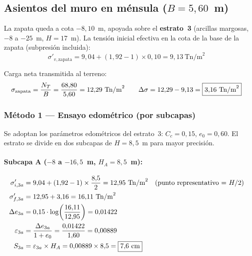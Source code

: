 \subsection{Asientos del muro en ménsula ($B = 5{,}60$~m)}
\label{subsec:asientos_muro_56m}

La zapata queda a cota $-8{,}10$~m, apoyada sobre el \textbf{estrato~3}
(arcillas margosas, $-8$ a $-25$~m, $H = 17$~m). La tensión inicial
efectiva en la cota de la base de la zapata (subpresión incluida):
\[
  \sigma'_{v,\text{zapata}} = 9{,}04 + (1{,}92-1)\times 0{,}10 = 9{,}13~\text{Tn/m}^2
\]

Carga neta transmitida al terreno:
\[
  \sigma_\text{zapata} = \frac{N_T}{B} = \frac{68{,}80}{5{,}60} = 12{,}29~\text{Tn/m}^2
  \qquad
  \Delta\sigma = 12{,}29 - 9{,}13 = \boxed{3{,}16~\text{Tn/m}^2}
\]

\subsubsection{Método 1 — Ensayo edométrico (por subcapas)}

Se adoptan los parámetros edométricos del estrato~3: $C_c = 0{,}15$,
$e_0 = 0{,}60$. El estrato se divide en dos subcapas de $H = 8{,}5$~m
para mayor precisión.

\paragraph{Subcapa A ($-8$ a $-16{,}5$~m, $H_{A} = 8{,}5$~m):}
\begin{align*}
  \sigma'_{i,3a} &= 9{,}04 + (1{,}92-1)\times\frac{8{,}5}{2} = 12{,}95~\text{Tn/m}^2
    \quad\text{(punto representativo = } H/2\text{)} \\
  \sigma'_{f,3a} &= 12{,}95 + 3{,}16 = 16{,}11~\text{Tn/m}^2 \\
  \Delta e_{3a}  &= 0{,}15\cdot\log\!\left(\frac{16{,}11}{12{,}95}\right) = 0{,}01422 \\
  \varepsilon_{3a} &= \frac{\Delta e_{3a}}{1+e_0} = \frac{0{,}01422}{1{,}60} = 0{,}00889 \\
  S_{3a} &= \varepsilon_{3a}\times H_A = 0{,}00889\times 8{,}5 = \boxed{7{,}6~\text{cm}}
\end{align*}

